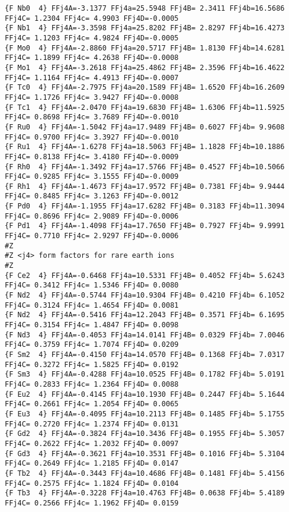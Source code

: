 {\begin{verbatim}
{F Nb0  4} FFj4A=-3.1377 FFj4a=25.5948 FFj4B= 2.3411 FFj4b=16.5686 FFj4C= 1.2304 FFj4c= 4.9903 FFj4D=-0.0005 
{F Nb1  4} FFj4A=-3.3598 FFj4a=25.8202 FFj4B= 2.8297 FFj4b=16.4273 FFj4C= 1.1203 FFj4c= 4.9824 FFj4D=-0.0005 
{F Mo0  4} FFj4A=-2.8860 FFj4a=20.5717 FFj4B= 1.8130 FFj4b=14.6281 FFj4C= 1.1899 FFj4c= 4.2638 FFj4D=-0.0008 
{F Mo1  4} FFj4A=-3.2618 FFj4a=25.4862 FFj4B= 2.3596 FFj4b=16.4622 FFj4C= 1.1164 FFj4c= 4.4913 FFj4D=-0.0007 
{F Tc0  4} FFj4A=-2.7975 FFj4a=20.1589 FFj4B= 1.6520 FFj4b=16.2609 FFj4C= 1.1726 FFj4c= 3.9427 FFj4D=-0.0008 
{F Tc1  4} FFj4A=-2.0470 FFj4a=19.6830 FFj4B= 1.6306 FFj4b=11.5925 FFj4C= 0.8698 FFj4c= 3.7689 FFj4D=-0.0010 
{F Ru0  4} FFj4A=-1.5042 FFj4a=17.9489 FFj4B= 0.6027 FFj4b= 9.9608 FFj4C= 0.9700 FFj4c= 3.3927 FFj4D=-0.0010 
{F Ru1  4} FFj4A=-1.6278 FFj4a=18.5063 FFj4B= 1.1828 FFj4b=10.1886 FFj4C= 0.8138 FFj4c= 3.4180 FFj4D=-0.0009 
{F Rh0  4} FFj4A=-1.3492 FFj4a=17.5766 FFj4B= 0.4527 FFj4b=10.5066 FFj4C= 0.9285 FFj4c= 3.1555 FFj4D=-0.0009 
{F Rh1  4} FFj4A=-1.4673 FFj4a=17.9572 FFj4B= 0.7381 FFj4b= 9.9444 FFj4C= 0.8485 FFj4c= 3.1263 FFj4D=-0.0012 
{F Pd0  4} FFj4A=-1.1955 FFj4a=17.6282 FFj4B= 0.3183 FFj4b=11.3094 FFj4C= 0.8696 FFj4c= 2.9089 FFj4D=-0.0006 
{F Pd1  4} FFj4A=-1.4098 FFj4a=17.7650 FFj4B= 0.7927 FFj4b= 9.9991 FFj4C= 0.7710 FFj4c= 2.9297 FFj4D=-0.0006 
#Z
#Z <j4> form factors for rare earth ions
#Z
{F Ce2  4} FFj4A=-0.6468 FFj4a=10.5331 FFj4B= 0.4052 FFj4b= 5.6243 FFj4C= 0.3412 FFj4c= 1.5346 FFj4D= 0.0080 
{F Nd2  4} FFj4A=-0.5744 FFj4a=10.9304 FFj4B= 0.4210 FFj4b= 6.1052 FFj4C= 0.3124 FFj4c= 1.4654 FFj4D= 0.0081 
{F Nd2  4} FFj4A=-0.5416 FFj4a=12.2043 FFj4B= 0.3571 FFj4b= 6.1695 FFj4C= 0.3154 FFj4c= 1.4847 FFj4D= 0.0098 
{F Nd3  4} FFj4A=-0.4053 FFj4a=14.0141 FFj4B= 0.0329 FFj4b= 7.0046 FFj4C= 0.3759 FFj4c= 1.7074 FFj4D= 0.0209 
{F Sm2  4} FFj4A=-0.4150 FFj4a=14.0570 FFj4B= 0.1368 FFj4b= 7.0317 FFj4C= 0.3272 FFj4c= 1.5825 FFj4D= 0.0192 
{F Sm3  4} FFj4A=-0.4288 FFj4a=10.0525 FFj4B= 0.1782 FFj4b= 5.0191 FFj4C= 0.2833 FFj4c= 1.2364 FFj4D= 0.0088 
{F Eu2  4} FFj4A=-0.4145 FFj4a=10.1930 FFj4B= 0.2447 FFj4b= 5.1644 FFj4C= 0.2661 FFj4c= 1.2054 FFj4D= 0.0065 
{F Eu3  4} FFj4A=-0.4095 FFj4a=10.2113 FFj4B= 0.1485 FFj4b= 5.1755 FFj4C= 0.2720 FFj4c= 1.2374 FFj4D= 0.0131 
{F Gd2  4} FFj4A=-0.3824 FFj4a=10.3436 FFj4B= 0.1955 FFj4b= 5.3057 FFj4C= 0.2622 FFj4c= 1.2032 FFj4D= 0.0097 
{F Gd3  4} FFj4A=-0.3621 FFj4a=10.3531 FFj4B= 0.1016 FFj4b= 5.3104 FFj4C= 0.2649 FFj4c= 1.2185 FFj4D= 0.0147 
{F Tb2  4} FFj4A=-0.3443 FFj4a=10.4686 FFj4B= 0.1481 FFj4b= 5.4156 FFj4C= 0.2575 FFj4c= 1.1824 FFj4D= 0.0104 
{F Tb3  4} FFj4A=-0.3228 FFj4a=10.4763 FFj4B= 0.0638 FFj4b= 5.4189 FFj4C= 0.2566 FFj4c= 1.1962 FFj4D= 0.0159 

\end{verbatim}}
